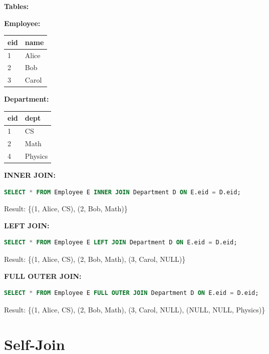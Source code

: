 \begin{examplebox}
\textbf{Tables:}

\begin{minipage}{0.45\textwidth}
\textbf{Employee:}
\begin{tabular}{ll}
\toprule
\textbf{eid} & \textbf{name} \\
\midrule
1 & Alice \\
2 & Bob \\
3 & Carol \\
\bottomrule
\end{tabular}
\end{minipage}
\begin{minipage}{0.45\textwidth}
\textbf{Department:}
\begin{tabular}{ll}
\toprule
\textbf{eid} & \textbf{dept} \\
\midrule
1 & CS \\
2 & Math \\
4 & Physics \\
\bottomrule
\end{tabular}
\end{minipage}

\vspace{0.5cm}

\textbf{INNER JOIN:}
\begin{lstlisting}[language=SQL]
SELECT * FROM Employee E INNER JOIN Department D ON E.eid = D.eid;
\end{lstlisting}
Result: \{(1, Alice, CS), (2, Bob, Math)\}

\textbf{LEFT JOIN:}
\begin{lstlisting}[language=SQL]
SELECT * FROM Employee E LEFT JOIN Department D ON E.eid = D.eid;
\end{lstlisting}
Result: \{(1, Alice, CS), (2, Bob, Math), (3, Carol, NULL)\}

\textbf{FULL OUTER JOIN:}
\begin{lstlisting}[language=SQL]
SELECT * FROM Employee E FULL OUTER JOIN Department D ON E.eid = D.eid;
\end{lstlisting}
Result: \{(1, Alice, CS), (2, Bob, Math), (3, Carol, NULL), (NULL, NULL, Physics)\}
\end{examplebox}

\section{Self-Join}

